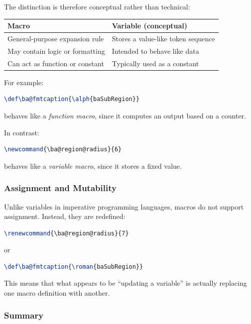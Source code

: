 The distinction is therefore conceptual rather than technical:

\begin{center}
\begin{tabular}{ll}
\textbf{Macro} & \textbf{Variable (conceptual)} \\
\hline
General-purpose expansion rule & Stores a value-like token sequence \\
May contain logic or formatting & Intended to behave like data \\
Can act as function or constant & Typically used as a constant \\
\end{tabular}
\end{center}
For example:

\begin{lstlisting}[language=LaTeX]
\def\ba@fmtcaption{\alph{baSubRegion}}
\end{lstlisting}
behaves like a \emph{function macro}, since it computes an output based on a counter.

In contrast:

\begin{lstlisting}[language=LaTeX]
\newcommand{\ba@region@radius}{6}
\end{lstlisting}
behaves like a \emph{variable macro}, since it stores a fixed value.

\subsubsection{Assignment and Mutability}

Unlike variables in imperative programming languages, macros do not support assignment. Instead, they are redefined:

\begin{lstlisting}[language=LaTeX]
\renewcommand{\ba@region@radius}{7}
\end{lstlisting}
or

\begin{lstlisting}[language=LaTeX]
\def\ba@fmtcaption{\roman{baSubRegion}}
\end{lstlisting}

This means that what appears to be ``updating a variable'' is actually replacing one macro definition with another.

\subsubsection{Summary}

